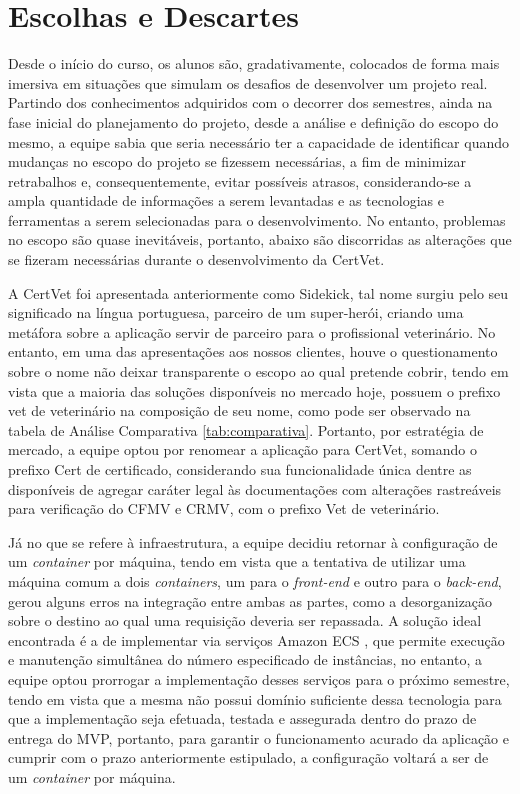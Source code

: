 \documentclass[
    12pt,               %
    openright,          %
    oneside,
    a4paper,            %
    BIBLATEX,           %
    TODO,               %
    english,            %
    brazil              %
    ]{ifsp-spo-inf-ctds}
\begin{document}
    \section{Escolhas e Descartes}
    Desde o início do curso, os alunos são, gradativamente, colocados de forma mais imersiva em situações que simulam os desafios de desenvolver um projeto real. Partindo dos conhecimentos adquiridos com o decorrer dos semestres, ainda na fase inicial do planejamento do projeto, desde a análise e definição do escopo do mesmo, a equipe sabia que seria necessário ter a capacidade de identificar quando mudanças no escopo do projeto se fizessem necessárias, a fim de minimizar retrabalhos e, consequentemente, evitar possíveis atrasos, considerando-se a ampla quantidade de informações a serem levantadas e as tecnologias e ferramentas a serem selecionadas para o desenvolvimento. No entanto, problemas no escopo são quase inevitáveis, portanto, abaixo são discorridas as alterações que se fizeram necessárias durante o desenvolvimento da CertVet.

    A CertVet foi apresentada anteriormente como Sidekick, tal nome surgiu pelo seu significado na língua portuguesa, parceiro de um super-herói, criando uma metáfora sobre a aplicação servir de parceiro para o profissional veterinário. No entanto, em uma das apresentações aos nossos clientes, houve o questionamento sobre o nome não deixar transparente o escopo ao qual pretende cobrir, tendo em vista que a maioria das soluções disponíveis no mercado hoje, possuem o prefixo vet de veterinário na composição de seu nome, como pode ser observado na tabela de Análise Comparativa \ref{tab:comparativa}. Portanto, por estratégia de mercado, a equipe optou por renomear a aplicação para CertVet, somando o prefixo Cert de certificado, considerando sua funcionalidade única dentre as disponíveis de agregar caráter legal às documentações com alterações rastreáveis para verificação do CFMV e CRMV, com o prefixo Vet de veterinário.

    Já no que se refere à infraestrutura, a equipe decidiu retornar à configuração de um \emph{container} por máquina, tendo em vista que a tentativa de utilizar uma máquina comum a dois \emph{containers}, um para o \emph{front-end} e outro para o \emph{back-end}, gerou alguns erros na integração entre ambas as partes, como a desorganização sobre o destino ao qual uma requisição deveria ser repassada. A solução ideal encontrada é a de implementar via serviços Amazon ECS , que permite execução e manutenção simultânea do número especificado de instâncias, no entanto, a equipe optou prorrogar a implementação desses serviços para o próximo semestre, tendo em vista que a mesma não possui domínio suficiente dessa tecnologia para que a implementação seja efetuada, testada e assegurada dentro do prazo de entrega do MVP, portanto, para garantir o funcionamento acurado da aplicação e cumprir com o prazo anteriormente estipulado, a configuração voltará a ser de um \emph{container} por máquina.
\end{document}
